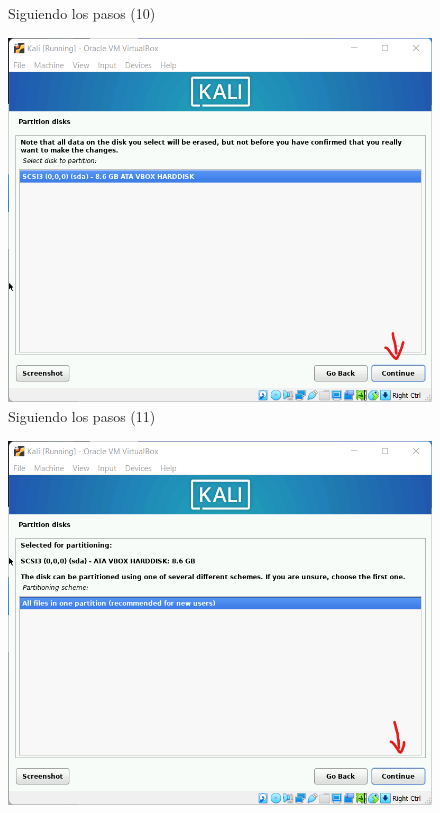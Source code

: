 \documentclass[stu, 12pt, letterpaper, donotrepeattitle, floatsintext, natbib, helv]{apa7}
\begin{document}
\begin{enumerate}
\begin{figure} [H]
        \caption{Siguiendo los pasos (10)}
        \label{fig:Inst10}
    \end{figure}
    \begin{figure} [H]
        \includegraphics[width = 1\textwidth]{Installation11.png}
        \caption{Siguiendo los pasos (11)}
        \label{fig:Inst11}
    \end{figure}
    \begin{figure} [H]
        \includegraphics[width = 1\textwidth]{Installation12.png}

\end{figure}
\end{enumerate}
\end{document}
